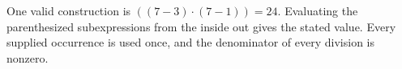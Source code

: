 One valid construction is $\boxed{((7-3)\cdot (7-1))=24}$. Evaluating the parenthesized subexpressions from the inside out gives the stated value. Every supplied occurrence is used once, and the denominator of every division is nonzero.

